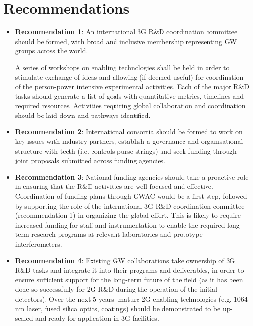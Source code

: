 \section*{Recommendations}
\begin{itemize}
\item \textbf{Recommendation 1}:  An international 3G R\&D coordination committee should be formed, with broad and inclusive membership representing GW groups across the world.

 A series of workshops on enabling technologies shall be held in order to stimulate exchange of ideas and allowing (if deemed useful) for coordination of the person-power intensive experimental activities.  Each of the major R\&D tasks should generate a list of  goals with quantitative metrics,  timelines and required resources.   Activities requiring global collaboration and coordination should be laid down and pathways identified.

\item \textbf{Recommendation 2}:  International consortia should be formed to work on key issues with industry partners, establish a governance and organisational structure with teeth (i.e. controls purse strings) and seek funding through joint proposals submitted across funding agencies.
\pagebreak
\item \textbf{Recommendation 3}: 
National funding agencies should take a proactive role in ensuring that the R\&D activities are well-focused and effective.  Coordination of funding plans through GWAC would be a first step, followed by supporting the role of the international 3G R\&D coordination committee (recommendation 1) in organizing the global effort.  This is likely to require increased funding for staff and instrumentation to enable the required long-term research programs at relevant laboratories and prototype interferometers.

\item \textbf{Recommendation 4}: Existing GW collaborations take ownership of 3G R\&D tasks and integrate it into their programs and deliverables, in order to ensure sufficient support for the long-term future of the field (as it has been done so successfully for 2G R\&D during the operation of the initial detectors). Over the next 5 years, mature 2G enabling technologies (e.g. 1064\,nm laser, fused silica optics, coatings) should be demonstrated to be up-scaled and ready for application in 3G facilities.



\end{itemize}

